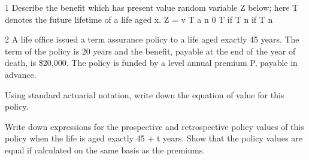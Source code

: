 \documentclass[a4paper,12pt]{article}
\begin{document}
1
Describe the benefit which has present value random variable Z below; here T denotes
the future lifetime of a life aged x.
Z =
v T a n
0
T
if T n
if T n

2
A life office issued a term assurance policy to a life aged exactly 45 years. The term
of the policy is 20 years and the benefit, payable at the end of the year of death, is
\$20,000. The policy is funded by a level annual premium P, payable in advance.
\item  Using standard actuarial notation, write down the equation of value for this
policy.
\item  Write down expressions for the prospective and retrospective policy values of
this policy when the life is aged exactly 45 + t years. Show that the policy
values are equal if calculated on the same basis as the premiums.
\end{document}
